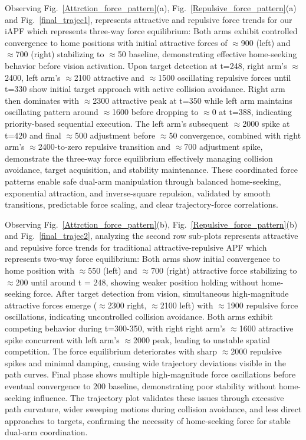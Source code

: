\documentclass[utf8]{FrontiersinHarvard}
\begin{document}
Observing Fig.~\ref{Attrction_force_pattern}(a), Fig.~\ref{Repulsive_force_pattern}(a) and Fig.~\ref{final_trajec1}, represents attractive and repulsive force trends for our iAPF which represents three-way force equilibrium: 
Both arms exhibit controlled convergence to home positions with initial attractive forces of $\approx$900 (left) and $\approx$700 (right) stabilizing to $\approx$50 baseline, demonstrating effective home-seeking behavior before vision activation. Upon target detection at t=248, right arm’s $\approx$2400, left arm's $\approx$2100 attractive and $\approx$1500 oscillating repulsive forces until t=330 show initial target approach with active collision avoidance. Right arm then dominates with $\approx$2300 attractive peak at t=350 while left arm maintains oscillating pattern around $\approx$1600 before dropping to $\approx$0 at t=388, indicating priority-based sequential execution. The left arm's subsequent $\approx$2000 spike at t=420 and final $\approx$500 adjustment before $\approx$50 convergence, combined with right arm's $\approx$2400-to-zero repulsive transition and $\approx$700 adjustment spike, demonstrate the three-way force equilibrium effectively managing collision avoidance, target acquisition, and stability maintenance. These coordinated force patterns enable safe dual-arm manipulation through balanced home-seeking, exponential attraction, and inverse-square repulsion, validated by smooth transitions, predictable force scaling, and clear trajectory-force correlations.

Observing Fig.~\ref{Attrction_force_pattern}(b), Fig.~\ref{Repulsive_force_pattern}(b) and Fig.~\ref{final_trajec2}, analyzing the second row sub-plots represents attractive and repulsive force trends for traditional attractive-repulsive APF which represents two-way force equilibrium: Both arms show initial convergence to home position with $\approx$550 (left) and $\approx$700 (right) attractive force stabilizing to $\approx$200 until around t = 248, showing weaker position holding without home-seeking force. After target detection from vision, simultaneous high-magnitude attractive forces emerge ($\approx$2300 right, $\approx$2100 left) with $\approx$1900 repulsive force oscillations, indicating uncontrolled collision avoidance. Both arms exhibit competing behavior during t=300-350, with right right arm's $\approx$1600 attractive spike concurrent with left arm's $\approx$2000 peak, leading to unstable spatial competition. The force equilibrium deteriorates with sharp $\approx$2000 repulsive spikes and minimal damping, causing wide trajectory deviations visible in the path curves. Final phase shows multiple high-magnitude force oscillations before eventual convergence to 200 baseline, demonstrating poor stability without home-seeking influence. The trajectory plot validates these issues through excessive path curvature, wider sweeping motions during collision avoidance, and less direct approaches to targets, confirming the necessity of home-seeking force for stable dual-arm coordination.
\end{document}
